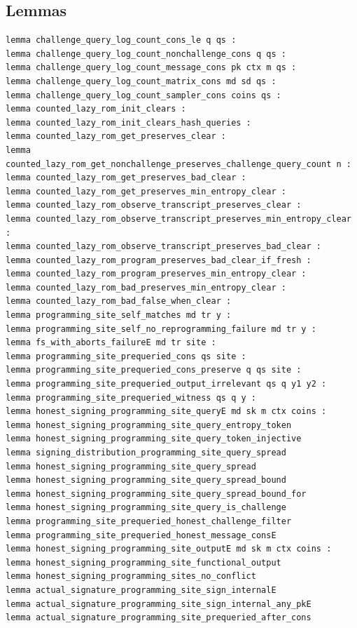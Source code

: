 \subsection*{Lemmas}
\begin{lstlisting}[language=EasyCrypt,basicstyle=\ttfamily\tiny]
lemma challenge_query_log_count_cons_le q qs :
lemma challenge_query_log_count_nonchallenge_cons q qs :
lemma challenge_query_log_count_message_cons pk ctx m qs :
lemma challenge_query_log_count_matrix_cons md sd qs :
lemma challenge_query_log_count_sampler_cons coins qs :
lemma counted_lazy_rom_init_clears :
lemma counted_lazy_rom_init_clears_hash_queries :
lemma counted_lazy_rom_get_preserves_clear :
lemma counted_lazy_rom_get_nonchallenge_preserves_challenge_query_count n :
lemma counted_lazy_rom_get_preserves_bad_clear :
lemma counted_lazy_rom_get_preserves_min_entropy_clear :
lemma counted_lazy_rom_observe_transcript_preserves_clear :
lemma counted_lazy_rom_observe_transcript_preserves_min_entropy_clear :
lemma counted_lazy_rom_observe_transcript_preserves_bad_clear :
lemma counted_lazy_rom_program_preserves_bad_clear_if_fresh :
lemma counted_lazy_rom_program_preserves_min_entropy_clear :
lemma counted_lazy_rom_bad_preserves_min_entropy_clear :
lemma counted_lazy_rom_bad_false_when_clear :
lemma programming_site_self_matches md tr y :
lemma programming_site_self_no_reprogramming_failure md tr y :
lemma fs_with_aborts_failureE md tr site :
lemma programming_site_prequeried_cons qs site :
lemma programming_site_prequeried_cons_preserve q qs site :
lemma programming_site_prequeried_output_irrelevant qs q y1 y2 :
lemma programming_site_prequeried_witness qs q y :
lemma honest_signing_programming_site_queryE md sk m ctx coins :
lemma honest_signing_programming_site_query_entropy_token
lemma honest_signing_programming_site_query_token_injective
lemma signing_distribution_programming_site_query_spread
lemma honest_signing_programming_site_query_spread
lemma honest_signing_programming_site_query_spread_bound
lemma honest_signing_programming_site_query_spread_bound_for
lemma honest_signing_programming_site_query_is_challenge
lemma programming_site_prequeried_honest_challenge_filter
lemma programming_site_prequeried_honest_message_consE
lemma honest_signing_programming_site_outputE md sk m ctx coins :
lemma honest_signing_programming_site_functional_output
lemma honest_signing_programming_sites_no_conflict
lemma actual_signature_programming_site_sign_internalE
lemma actual_signature_programming_site_sign_internal_any_pkE
lemma actual_signature_programming_site_prequeried_after_cons

\end{lstlisting}

